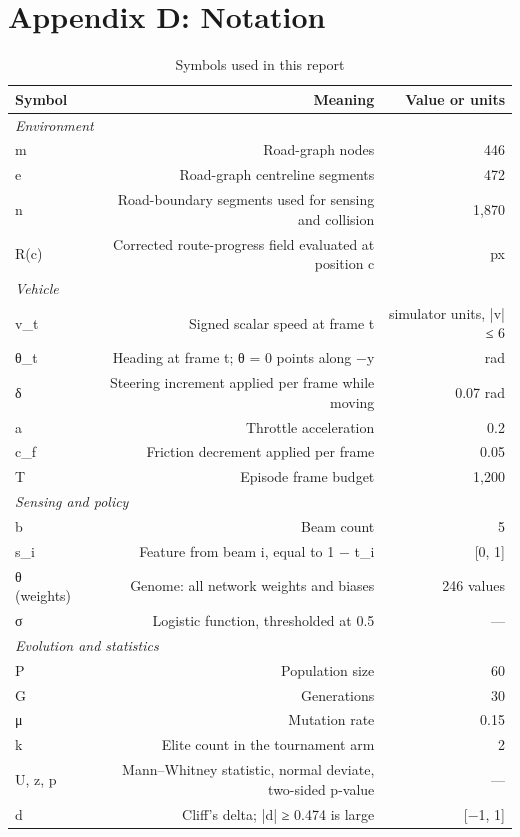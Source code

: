 \documentclass[conference]{IEEEtran}
\begin{document}
\section*{Appendix D: Notation}

\label{sec:appNotation}

\begin{table}[!t]
\caption{Symbols used in this report}
\label{tab:notation}
\centering
\footnotesize
\begin{tabular}{lrr}
\toprule
Symbol & Meaning & Value or units \\
\midrule
\multicolumn{3}{l}{\emph{Environment}} \\
m & Road-graph nodes & 446 \\
e & Road-graph centreline segments & 472 \\
n & Road-boundary segments used for sensing and collision & 1,870 \\
R(c) & Corrected route-progress field evaluated at position c & px \\
\multicolumn{3}{l}{\emph{Vehicle}} \\
v\_t & Signed scalar speed at frame t & simulator units, |v| ≤ 6 \\
θ\_t & Heading at frame t; θ = 0 points along −y & rad \\
δ & Steering increment applied per frame while moving & 0.07 rad \\
a & Throttle acceleration & 0.2 \\
c\_f & Friction decrement applied per frame & 0.05 \\
T & Episode frame budget & 1,200 \\
\multicolumn{3}{l}{\emph{Sensing and policy}} \\
b & Beam count & 5 \\
s\_i & Feature from beam i, equal to 1 − t\_i & [0, 1] \\
θ (weights) & Genome: all network weights and biases & 246 values \\
σ & Logistic function, thresholded at 0.5 & — \\
\multicolumn{3}{l}{\emph{Evolution and statistics}} \\
P & Population size & 60 \\
G & Generations & 30 \\
μ & Mutation rate & 0.15 \\
k & Elite count in the tournament arm & 2 \\
U, z, p & Mann–Whitney statistic, normal deviate, two-sided p-value & — \\
d & Cliff's delta; |d| ≥ 0.474 is large & [−1, 1] \\
\bottomrule
\end{tabular}
\end{table}
\end{document}
